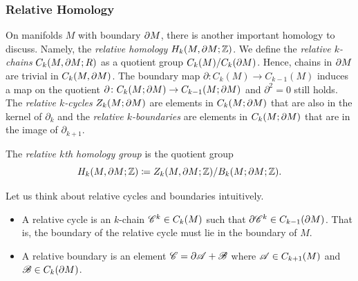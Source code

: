 \documentclass{article}
\begin{document}
\subsubsection{Relative Homology}

On manifolds $M$ with boundary ${\partial M}$, there is another important homology to discuss. Namely, the \emph{relative homology} $H_k(M,{\partial M};\mathbb{Z})$. We define the \emph{relative $k$-chains} $C_k(M,{\partial M};R)$ as a quotient group $C_k(M)/C_k({\partial M})$. Hence, chains in ${\partial M}$ are trivial in $C_k(M,{\partial M})$. The boundary map $\partial \colon C_k(M)\to C_{k-1}(M)$ induces a map on the quotient $\partial \colon C_k(M;{\partial M}) \to C_{k-1}(M;{\partial M})$ and $\partial^2=0$ still holds. The \emph{relative $k$-cycles} $Z_k(M;{\partial M})$ are elements in $C_k(M;{\partial M})$ that are also in the kernel of $\partial_k$ and the \emph{relative $k$-boundaries} are elements in $C_k(M;{\partial M})$ that are in the image of $\partial_{k+1}$.

\begin{definition}
The \emph{relative $k$th homology group} is the quotient group
\begin{equation}
    H_k(M,\partial M;\mathbb{Z}) \coloneqq Z_k(M,{\partial M};\mathbb{Z})/B_k(M;{\partial M};\mathbb{Z}).
\end{equation}
\end{definition}

Let us think about relative cycles and boundaries intuitively.
\begin{itemize}
    \item A relative cycle is an $k$-chain $\mathscr{C}^k \in C_k(M)$ such that $\partial \mathscr{C}^k \in C_{k-1}({\partial M})$. That is, the boundary of the relative cycle must lie in the boundary of $M$.
    \item A relative boundary is an element $\mathscr{C} = \partial \mathscr{A} + \mathscr{B}$ where $\mathscr{A} \in C_{k+1}(M)$ and $\mathscr{B} \in C_k({\partial M})$.
\end{itemize}
\end{document}
